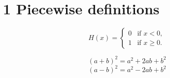 \documentclass{article}
\begin{document}
\section*{1 Piecewise definitions}

\[
H(x) = \begin{cases} 0 & \text{if } x < 0, \\ 1 & \text{if } x \geq 0. \end{cases}
\]

\begin{equation}
(a + b)^2 = a^2 + 2ab + b^2
\end{equation}
\begin{equation}
(a - b)^2 = a^2 - 2ab + b^2
\end{equation}
\end{document}
